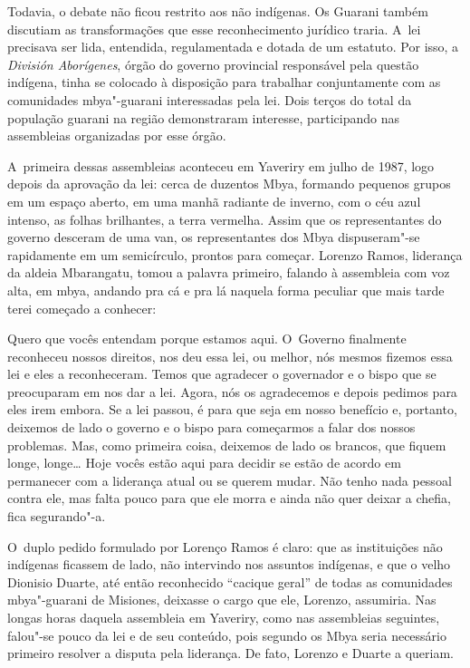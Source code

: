 Todavia, o debate não ficou restrito aos não indígenas. Os Guarani
também discutiam as transformações que esse reconhecimento jurídico
traria. A~lei precisava ser lida, entendida, regulamentada e dotada de
um estatuto. Por isso, a \emph{División Aborígenes}, órgão do governo
provincial responsável pela questão indígena, tinha se colocado à
disposição para trabalhar conjuntamente com as comunidades mbya"-guarani
interessadas pela lei. Dois terços do total da população guarani na
região demonstraram interesse, participando nas assembleias organizadas
por esse órgão. 

A~primeira dessas assembleias aconteceu em Yaveriry em julho de 1987,
logo depois da aprovação da lei: cerca de duzentos Mbya, formando
pequenos grupos em um espaço aberto, em uma manhã radiante de inverno,
com o céu azul intenso, as folhas brilhantes, a terra vermelha. Assim
que os representantes do governo desceram de uma van, os representantes
dos Mbya dispuseram"-se rapidamente em um semicírculo, prontos para
começar. Lorenzo Ramos, liderança da aldeia Mbarangatu, tomou a palavra
primeiro, falando à assembleia com voz alta, em mbya, andando pra cá e
pra lá naquela forma peculiar que mais tarde terei começado a conhecer:

Quero que vocês entendam porque estamos aqui. O~Governo finalmente
reconheceu nossos direitos, nos deu essa lei, ou melhor, nós mesmos
fizemos essa lei e eles a reconheceram. Temos que agradecer o
governador e o bispo que se preocuparam em nos dar a lei. Agora, nós os
agradecemos e depois pedimos para eles irem embora. Se a lei passou, é
para que seja em nosso benefício e, portanto, deixemos de lado o
governo e o bispo para começarmos a falar dos nossos problemas. Mas,
como primeira coisa, deixemos de lado os brancos, que fiquem longe,
longe\ldots{} Hoje vocês estão aqui para decidir se estão de acordo em
permanecer com a liderança atual ou se querem mudar. Não tenho nada
pessoal contra ele, mas falta pouco para que ele morra e ainda não quer
deixar a chefia, fica segurando"-a.

O~duplo pedido formulado por Lorenço Ramos é claro: que as instituições
não indígenas ficassem de lado, não intervindo nos assuntos indígenas,
e que o velho Dionisio Duarte, até então reconhecido ``cacique geral'' de
todas as comunidades mbya"-guarani de Misiones, deixasse o cargo que
ele, Lorenzo, assumiria. Nas longas horas daquela assembleia em
Yaveriry, como nas assembleias seguintes, falou"-se pouco da lei e de
seu conteúdo, pois segundo os Mbya seria necessário primeiro resolver a
disputa pela liderança. De fato, Lorenzo e Duarte a queriam.

